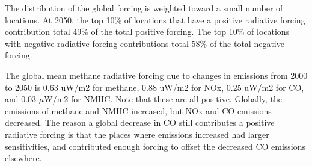The distribution of the global forcing is weighted toward a small number of locations. At 2050, the top 10\% of locations that have a positive radiative forcing contribution total 49\% of the total positive forcing. The top 10\% of locations with negative radiative forcing contributions total 58\% of the total negative forcing.

The global mean methane radiative forcing due to changes in emissions from 2000 to 2050 is 0.63 uW/m2 for methane, 0.88 uW/m2 for NOx, 0.25 uW/m2 for CO, and 0.03 $\mu $W/m2 for NMHC. Note that these are all positive. Globally, the emissions of methane and NMHC increased, but NOx and CO emissions decreased. The reason a global decrease in CO still contributes a positive radiative forcing is that the places where emissions increased had larger sensitivities, and contributed enough forcing to offset the decreased CO emissions elsewhere.
